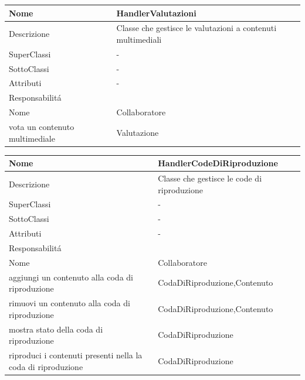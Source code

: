 \begin{center}
    \begin{tabular}{ |p{3cm}|p{3cm}|p{3cm}|p{3cm}| }
        \hline
        Nome & \multicolumn{3}{|p{9cm}|}{HandlerValutazioni} \\\hline
        Descrizione & \multicolumn{3}{|p{9cm}|}{Classe che gestisce le valutazioni a contenuti multimediali} \\\hline
        SuperClassi & \multicolumn{3}{|p{9cm}|}{-} \\\hline
        SottoClassi & \multicolumn{3}{|p{9cm}|}{-} \\\hline
        Attributi & \multicolumn{3}{|p{9cm}|}{-} \\\hline
        \multicolumn{4}{|p{12cm}|}{Responsabilit\'a} \\\hline
        \multicolumn{2}{|p{6cm}|}{Nome} & \multicolumn{2}{|p{6cm}|}{Collaboratore} \\\hline
        \multicolumn{2}{|p{6cm}|}{vota un contenuto multimediale} & \multicolumn{2}{|p{6cm}|}{Valutazione} \\\hline
    \end{tabular}
\end{center}

\begin{center}
    \begin{tabular}{ |p{3cm}|p{3cm}|p{3cm}|p{3cm}| }
        \hline
        Nome & \multicolumn{3}{|p{9cm}|}{HandlerCodeDiRiproduzione} \\\hline
        Descrizione & \multicolumn{3}{|p{9cm}|}{Classe che gestisce le code di riproduzione} \\\hline
        SuperClassi & \multicolumn{3}{|p{9cm}|}{-} \\\hline
        SottoClassi & \multicolumn{3}{|p{9cm}|}{-} \\\hline
        Attributi & \multicolumn{3}{|p{9cm}|}{-} \\\hline
        \multicolumn{4}{|p{12cm}|}{Responsabilit\'a} \\\hline
        \multicolumn{2}{|p{6cm}|}{Nome} & \multicolumn{2}{|p{6cm}|}{Collaboratore} \\\hline
        \multicolumn{2}{|p{6cm}|}{aggiungi un contenuto alla coda di riproduzione} & \multicolumn{2}{|p{6cm}|}{CodaDiRiproduzione,Contenuto} \\\hline
        \multicolumn{2}{|p{6cm}|}{rimuovi un contenuto alla coda di riproduzione} & \multicolumn{2}{|p{6cm}|}{CodaDiRiproduzione,Contenuto} \\\hline
        \multicolumn{2}{|p{6cm}|}{mostra stato della coda di riproduzione} & \multicolumn{2}{|p{6cm}|}{CodaDiRiproduzione} \\\hline
        \multicolumn{2}{|p{6cm}|}{riproduci i contenuti presenti nella la coda di riproduzione} & \multicolumn{2}{|p{6cm}|}{CodaDiRiproduzione} \\\hline
    \end{tabular}
\end{center}


